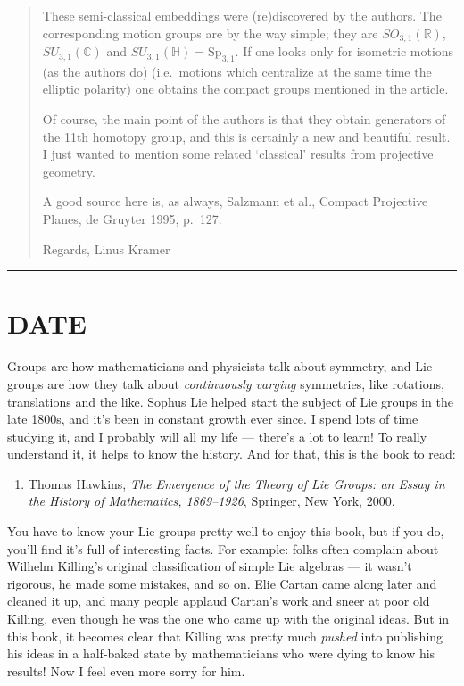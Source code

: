 \documentclass{article}
\def\tightlist{}
\begin{document}
\begin{quote}
These semi-classical embeddings were (re)discovered by the authors. The
corresponding motion groups are by the way simple; they are
\(SO_{3,1}(\mathbb{R})\), \(SU_{3,1}(\mathbb{C})\) and
\(SU_{3,1}(\mathbb{H})=\mathrm{Sp}_{3,1}\). If one looks only for
isometric motions (as the authors do) (i.e.~motions which centralize at
the same time the elliptic polarity) one obtains the compact groups
mentioned in the article.

Of course, the main point of the authors is that they obtain generators
of the 11th homotopy group, and this is certainly a new and beautiful
result. I just wanted to mention some related `classical' results from
projective geometry.

A good source here is, as always, Salzmann et al., Compact Projective
Planes, de Gruyter 1995, p.~127.

Regards, Linus Kramer
\end{quote}

\begin{center}\rule{0.5\linewidth}{0.5pt}\end{center}
\hypertarget{week174}{%
\section{DATE}\label{week174}}

Groups are how mathematicians and physicists talk about symmetry, and
Lie groups are how they talk about \emph{continuously varying}
symmetries, like rotations, translations and the like. Sophus Lie helped
start the subject of Lie groups in the late 1800s, and it's been in
constant growth ever since. I spend lots of time studying it, and I
probably will all my life --- there's a lot to learn! To really
understand it, it helps to know the history. And for that, this is the
book to read:

\begin{enumerate}
\def\labelenumi{\arabic{enumi})}
\tightlist
\item
  Thomas Hawkins, \emph{The Emergence of the Theory of Lie Groups: an
  Essay in the History of Mathematics, 1869--1926}, Springer, New York,
  2000.
\end{enumerate}

You have to know your Lie groups pretty well to enjoy this book, but if
you do, you'll find it's full of interesting facts. For example: folks
often complain about Wilhelm Killing's original classification of simple
Lie algebras --- it wasn't rigorous, he made some mistakes, and so on.
Elie Cartan came along later and cleaned it up, and many people applaud
Cartan's work and sneer at poor old Killing, even though he was the one
who came up with the original ideas. But in this book, it becomes clear
that Killing was pretty much \emph{pushed} into publishing his ideas in
a half-baked state by mathematicians who were dying to know his results!
Now I feel even more sorry for him.
\end{document}
